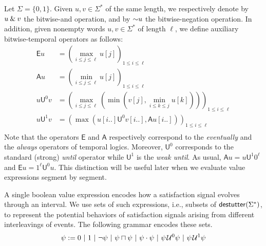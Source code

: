 Let $\Sigma = \{0,1\}$.
Given $u,v \in \Sigma^*$ of the same length, we respectively denote by $u \mathbin{\&} v$ the bitwise-and operation, and by $\mathord{\sim} u$ the bitwise-negation operation.
In addition, given nonempty words $u,v \in \Sigma^*$ of length $\ell$, we define auxiliary bitwise-temporal operators as follows:
\begin{align*}
\mathsf{E} u &= \left( \max_{i \leq j \leq \ell} u[j] \right)_{1 \leq i \leq \ell} \\
\mathsf{A} u &= \left( \min_{i \leq j \leq \ell} u[j] \right)_{1 \leq i \leq \ell} \\
u \mathsf{U}^0 v &= \left( \max_{i \leq j \leq \ell} \left( \min \left( v[j], \min_{i \leq k \leq j} u[k] \right) \right) \right)_{1 \leq i \leq \ell} \\
u \mathsf{U}^1 v &= \left( \max \left( u[i..] \mathsf{U}^0 v[i..], \mathsf{A} u[i..] \right) \right)_{1 \leq i \leq \ell} \\
\end{align*}
Note that the operators $\mathsf{E}$ and $\mathsf{A}$ respectively correspond to the \emph{eventually} and the \emph{always} operators of temporal logics.
%
Moreover, $\mathsf{U}^0$ corresponds to the standard (strong) \emph{until} operator while $\mathsf{U}^1$ is the \emph{weak until}.
As usual, $\mathsf{A} u = u \mathsf{U}^1 0^\ell$ and $\mathsf{E} u = 1^\ell \mathsf{U}^0 u$.
This distinction will be useful later when we evaluate value expressions segment by segment.

A single boolean value expression encodes how a satisfaction signal evolves through an interval.
We use sets of such expressions, i.e., subsets of $\mathsf{destutter}(\Sigma^*)$, to represent the potential behaviors of satisfaction signals arising from different interleavings of events.
The following grammar encodes these sets.
$$ \psi := 0 ~|~ 1 ~|~ \lnot \psi  ~|~ \psi \sqcap \psi ~|~ \psi \cdot \psi ~|~ \psi \kern.1em\mathcal{U}^0 \psi ~|~ \psi \kern.1em\mathcal{U}^1 \psi $$ %

